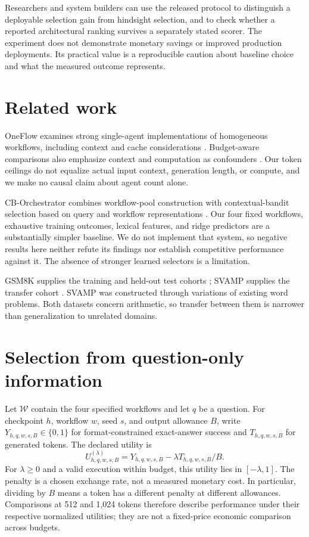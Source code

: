 \documentclass[10pt]{article}
\begin{document}
Researchers and system builders can use the released protocol to distinguish a deployable selection gain from hindsight selection, and to check whether a reported architectural ranking survives a separately stated scorer. The experiment does not demonstrate monetary savings or improved production deployments. Its practical value is a reproducible caution about baseline choice and what the measured outcome represents.

\section{Related work}
OneFlow examines strong single-agent implementations of homogeneous workflows, including context and cache considerations \citep{xu2026oneflow}. Budget-aware comparisons also emphasize context and computation as confounders \citep{tran2026equalbudget}. Our token ceilings do not equalize actual input context, generation length, or compute, and we make no causal claim about agent count alone.

CB-Orchestrator combines workflow-pool construction with contextual-bandit selection based on query and workflow representations \citep{sun2026cborchestrator}. Our four fixed workflows, exhaustive training outcomes, lexical features, and ridge predictors are a substantially simpler baseline. We do not implement that system, so negative results here neither refute its findings nor establish competitive performance against it. The absence of stronger learned selectors is a limitation.

GSM8K supplies the training and held-out test cohorts \citep{cobbe2021gsm8k}; SVAMP supplies the transfer cohort \citep{patel2021svamp}. SVAMP was constructed through variations of existing word problems. Both datasets concern arithmetic, so transfer between them is narrower than generalization to unrelated domains.

\section{Selection from question-only information}
\label{sec:selection-formulation}
Let $\mathcal W$ contain the four specified workflows and let $q$ be a question.
For checkpoint $h$, workflow $w$, seed $s$, and output allowance $B$, write
$Y_{h,q,w,s,B}\in\{0,1\}$ for format-constrained exact-answer success and
$T_{h,q,w,s,B}$ for generated tokens. The declared utility is
\begin{equation}
 U_{h,q,w,s,B}^{(\lambda)}
 =Y_{h,q,w,s,B}-\lambda T_{h,q,w,s,B}/B.
 \label{eq:workflow-utility}
\end{equation}
For $\lambda\geq0$ and a valid execution within budget, this utility lies in
$[-\lambda,1]$. The penalty is a chosen exchange rate, not a measured monetary
cost. In particular, dividing by $B$ means a token has a different penalty at
different allowances. Comparisons at 512 and 1,024 tokens therefore describe
performance under their respective normalized utilities; they are not a
fixed-price economic comparison across budgets.
\end{document}
